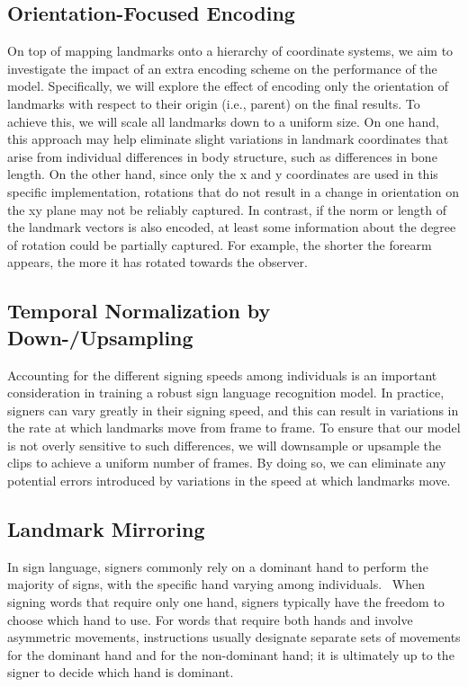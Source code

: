 \documentclass[10pt,twocolumn,letterpaper]{article}
\begin{document}
\begin{CJK*}{UTF8}{bsmi}

\subsection{Orientation-Focused Encoding}
{\color{blue} 
On top of mapping landmarks onto a hierarchy of coordinate systems, we aim to investigate the impact of an extra encoding scheme on the performance of the model. Specifically, we will explore the effect of encoding only the orientation of landmarks with respect to their origin (i.e., parent) on the final results. To achieve this, we will scale all landmarks down to a uniform size.
On one hand, this approach may help eliminate slight variations in landmark coordinates that arise from individual differences in body structure, such as differences in bone length. On the other hand, since only the x and y coordinates are used in this specific implementation, rotations that do not result in a change in orientation on the xy plane may not be reliably captured. In contrast, if the norm or length of the landmark vectors is also encoded, at least some information about the degree of rotation could be partially captured. For example, the shorter the forearm appears, the more it has rotated towards the observer.
}

\subsection{Temporal Normalization by Down-/Upsampling}
{\color{blue} 
Accounting for the different signing speeds among individuals is an important consideration in training a robust sign language recognition model. In practice, signers can vary greatly in their signing speed, and this can result in variations in the rate at which landmarks move from frame to frame. To ensure that our model is not overly sensitive to such differences, we will downsample or upsample the clips to achieve a uniform number of frames. By doing so, we can eliminate any potential errors introduced by variations in the speed at which landmarks move.
}

\subsection{Landmark Mirroring}
{\color{blue} 
In sign language, signers commonly rely on a dominant hand to perform the majority of signs, with the specific hand varying among individuals.~\cite{Sign} When signing words that require only one hand, signers typically have the freedom to choose which hand to use. For words that require both hands and involve asymmetric movements, instructions usually designate separate sets of movements for the dominant hand and for the non-dominant hand; it is ultimately up to the signer to decide which hand is dominant.

}
\end{CJK*}
\end{document}
